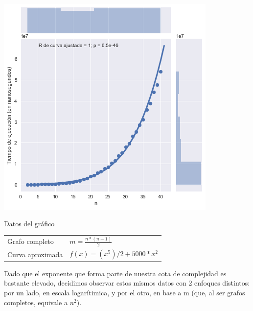\noindent
\begin{minipage}{0.55\textwidth}
    \hfill
    \includegraphics[scale=0.6]{img/local-n.png}
\end{minipage}
\hfill
\begin{minipage}{0.44\textwidth}
    \begin{center}
        Datos del gráfico

        \begin{tabular}{ | l l |}
            \hline
            Grafo completo & $m = \frac{n * (n-1)}{2}$\\ 
            Curva aproximada & $f(x) = (x^5) / 2 + 5000 * x^2$ \\
            \hline
        \end{tabular}
    \end{center}
\end{minipage}

Dado que el exponente que forma parte de nuestra cota de complejidad es bastante elevado, decidimos observar estos mismos datos con 2 enfoques distintos: por un lado, en escala logarítimica, y por el otro, en base a m (que, al ser grafos completos, equivale a $n^2$).


